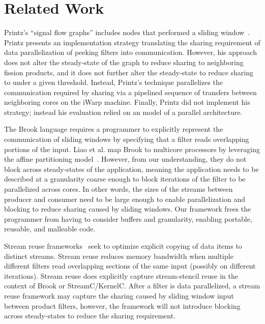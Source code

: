 \vspace{-5pt}
\section{Related Work}

Printz's ``signal flow graphs'' includes nodes that performed a
sliding window~\cite{printz91thesis}.  Printz presents an
implementation strategy translating the sharing requirement of data
parallelization of peeking filters into communication.  However, his
approach does not alter the steady-state of the graph to reduce
sharing to neighboring fission products, and it does not further alter
the steady-state to reduce sharing to under a given threshold.
Instead, Printz's technique parallelizes the communication required by
sharing via a pipelined sequence of transfers between neighboring
cores on the iWarp machine.  Finally, Printz did not implement his
strategy; instead his evaluation relied on an model of a parallel
architecture.


The Brook language requires a programmer to explicitly represent the
communication of sliding windows by specifying that a filter reads
overlapping portions of the input. Liao et al. map Brook to multicore
processors by leveraging the affine partitioning
model~\cite{liao06brook}. However, from our understanding, they do not
block across steady-states of the application, meaning the application
needs to be described at a granularity coarse enough to block
iterations of the filter to be parallelized across cores. In other
words, the sizes of the streams between producer and consumer need to
be large enough to enable parallelization and blocking to reduce
sharing caused by sliding windows.  Our framework frees the programmer
from having to consider buffers and granularity, enabling portable,
reusable, and malleable code.

Stream reuse frameworks~\cite{stream-reuse} seek to optimize explicit
copying of data items to distinct streams.  Stream reuse reduces
memory bandwidth when multiple different filters read overlapping
sections of the same input (possibly on different iterations). Stream
reuse does explicitly capture stream-stencil reuse in the context of
Brook or StreamC/KernelC.  After a filter is data parallelized, a
stream reuse framework may capture the sharing caused by sliding
window input between product filters, however, the framework will not
introduce blocking across steady-states to reduce the sharing
requirement.

